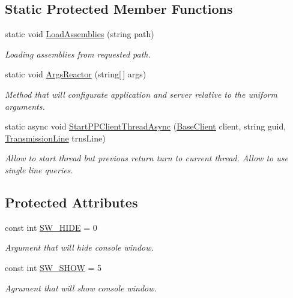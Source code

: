 \subsection*{Static Protected Member Functions}
\begin{DoxyCompactItemize}
\item 
static void \mbox{\hyperlink{class_uniform_client_1_1_base_client_a8abbd1d46cc50556eeae8bbd55ce680f}{Load\+Assemblies}} (string path)
\begin{DoxyCompactList}\small\item\em Loading assemblies from requested path. \end{DoxyCompactList}\item 
static void \mbox{\hyperlink{class_uniform_client_1_1_base_client_a7ec48981cf3e7ec10d2cb7dff81f912a}{Args\+Reactor}} (string\mbox{[}$\,$\mbox{]} args)
\begin{DoxyCompactList}\small\item\em Method that will configurate application and server relative to the uniform arguments. \end{DoxyCompactList}\item 
static async void \mbox{\hyperlink{class_uniform_client_1_1_base_client_a01e5a7ef4c760207cfa644ac2f6a407f}{Start\+P\+P\+Client\+Thread\+Async}} (\mbox{\hyperlink{class_uniform_client_1_1_base_client}{Base\+Client}} client, string guid, \mbox{\hyperlink{class_pipes_provider_1_1_client_1_1_transmission_line}{Transmission\+Line}} trns\+Line)
\begin{DoxyCompactList}\small\item\em Allow to start thread but previous return turn to current thread. Allow to use single line queries. \end{DoxyCompactList}\end{DoxyCompactItemize}
\subsection*{Protected Attributes}
\begin{DoxyCompactItemize}
\item 
const int \mbox{\hyperlink{class_uniform_client_1_1_base_client_a6060f2eb1d44ec518f2dfc99c8b4f7aa}{S\+W\+\_\+\+H\+I\+DE}} = 0
\begin{DoxyCompactList}\small\item\em Argument that will hide console window. \end{DoxyCompactList}\item 
const int \mbox{\hyperlink{class_uniform_client_1_1_base_client_a7545b9c72eef6cb7594a7001d3f558e4}{S\+W\+\_\+\+S\+H\+OW}} = 5
\begin{DoxyCompactList}\small\item\em Agrument that will show console window. \end{DoxyCompactList}\end{DoxyCompactItemize}
